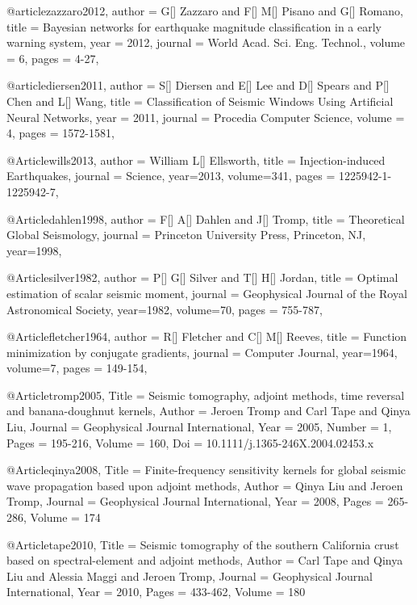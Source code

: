 @article{zazzaro2012,
author = {G[] Zazzaro and F[] M[] Pisano and G[] Romano},
title = {Bayesian networks for earthquake magnitude classification in a early warning system},
year = {2012},
journal = {World Acad. Sci. Eng. Technol.},
volume = {6},
pages = {4-27},
}

@article{diersen2011,
author = {S[] Diersen and E[] Lee and D[] Spears and P[] Chen and L[] Wang},
title = {Classification of Seismic Windows Using Artificial Neural Networks},
year = {2011},
journal = {Procedia Computer Science},
volume = {4},
pages = {1572-1581},
}

@Article{wills2013,
  author =	 {William L[] Ellsworth},
  title =	 {Injection-induced Earthquakes},
  journal =	 {Science},
  year=2013,
  volume=341,
  pages =	 {1225942-1-1225942-7},
}

@Article{dahlen1998,
  author =	 {F[] A[] Dahlen and J[] Tromp},
  title =	 {Theoretical Global Seismology},
  journal =	 {Princeton University Press, Princeton, NJ},
  year=1998,
}

@Article{silver1982,
  author =	 {P[] G[] Silver and T[] H[] Jordan},
  title =	 {Optimal estimation of scalar seismic moment},
  journal =	 {Geophysical Journal of the Royal Astronomical Society},
  year=1982,
  volume=70,
  pages =	 {755-787},
}


@Article{fletcher1964,
  author =	 {R[] Fletcher and C[] M[] Reeves},
  title =	 {Function minimization by conjugate gradients},
  journal =	 {Computer Journal},
  year=1964,
  volume=7,
  pages =	 {149-154},
}

@Article{tromp2005,
  Title                    = {Seismic tomography, adjoint methods, time reversal and banana-doughnut kernels},
  Author                   = {Jeroen Tromp and Carl Tape and Qinya Liu},
  Journal                  = {Geophysical Journal International},
  Year                     = {2005},
  Number                   = {1},
  Pages                    = {195-216},
  Volume                   = {160},
  Doi                      = {10.1111/j.1365-246X.2004.02453.x}
}

@Article{qinya2008,
  Title                    = {Finite-frequency sensitivity kernels for global seismic wave propagation based upon adjoint methods},
  Author                   = {Qinya Liu and Jeroen Tromp},
  Journal                  = {Geophysical Journal International},
  Year                     = {2008},
  Pages                    = {265-286},
  Volume                   = {174}
}


@Article{tape2010,
  Title                    = {Seismic tomography of the southern {C}alifornia crust based on spectral-element and adjoint methods},
  Author                   = {Carl Tape and Qinya Liu and Alessia Maggi and Jeroen Tromp},
  Journal                  = Geophysical Journal International,
  Year                     = {2010},
  Pages                    = {433-462},
  Volume                   = {180}
}

